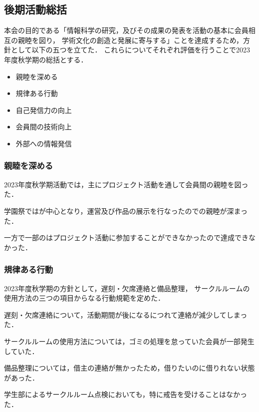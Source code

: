 \subsection*{後期活動総括}


本会の目的である「情報科学の研究，及びその成果の発表を活動の基本に会員相互の親睦を図り，
学術文化の創造と発展に寄与する」ことを達成するため，方針として以下の五つを立てた．
これらについてそれぞれ評価を行うことで2023年度秋学期の総括とする．

\begin{itemize}
    \item 親睦を深める
    \item 規律ある行動
    \item 自己発信力の向上
    \item 会員間の技術向上
    \item 外部への情報発信
\end{itemize}

\subsubsection*{親睦を深める}
    2023年度秋学期活動では，主にプロジェクト活動を通して会員間の親睦を図った．

    学園祭では\secondGrade{}が中心となり，運営及び作品の展示を行なったので\secondGrade{}の親睦が深まった．

    一方で一部の\firstGrade{}はプロジェクト活動に参加することができなかったので達成できなかった．

\subsubsection*{規律ある行動}
    2023年度秋学期の方針として，遅刻・欠席連絡と備品整理，
    サークルルームの使用方法の三つの項目からなる行動規範を定めた．

    遅刻・欠席連絡について，活動期間が後になるにつれて連絡が減少してしまった．

    サークルルームの使用方法については，ゴミの処理を怠っていた会員が一部発生していた．

    備品整理については，借主の連絡が無かったため，借りたいのに借りれない状態があった．

    学生部によるサークルルーム点検においても，特に戒告を受けることはなかった．

